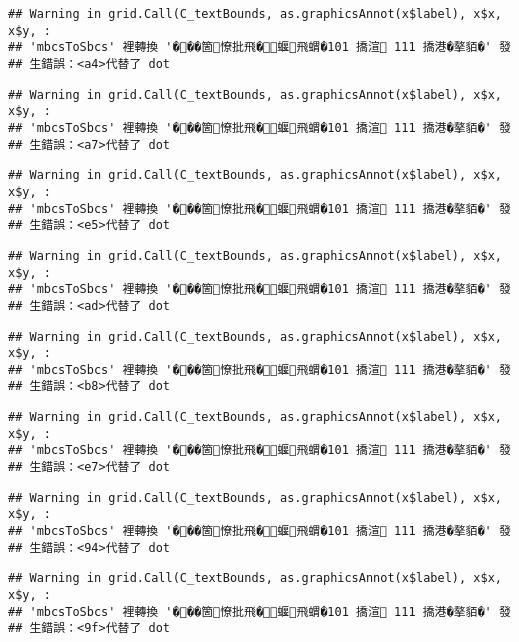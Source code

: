 \documentclass[
]{article}
\begin{document}
\begin{verbatim}
## Warning in grid.Call(C_textBounds, as.graphicsAnnot(x$label), x$x, x$y, :
## 'mbcsToSbcs' 裡轉換 '���箇憭批飛�蝘飛蝟�101 撟渲 111 撟港�摮貊�' 發
## 生錯誤：<a4>代替了 dot
\end{verbatim}

\begin{verbatim}
## Warning in grid.Call(C_textBounds, as.graphicsAnnot(x$label), x$x, x$y, :
## 'mbcsToSbcs' 裡轉換 '���箇憭批飛�蝘飛蝟�101 撟渲 111 撟港�摮貊�' 發
## 生錯誤：<a7>代替了 dot
\end{verbatim}

\begin{verbatim}
## Warning in grid.Call(C_textBounds, as.graphicsAnnot(x$label), x$x, x$y, :
## 'mbcsToSbcs' 裡轉換 '���箇憭批飛�蝘飛蝟�101 撟渲 111 撟港�摮貊�' 發
## 生錯誤：<e5>代替了 dot
\end{verbatim}

\begin{verbatim}
## Warning in grid.Call(C_textBounds, as.graphicsAnnot(x$label), x$x, x$y, :
## 'mbcsToSbcs' 裡轉換 '���箇憭批飛�蝘飛蝟�101 撟渲 111 撟港�摮貊�' 發
## 生錯誤：<ad>代替了 dot
\end{verbatim}

\begin{verbatim}
## Warning in grid.Call(C_textBounds, as.graphicsAnnot(x$label), x$x, x$y, :
## 'mbcsToSbcs' 裡轉換 '���箇憭批飛�蝘飛蝟�101 撟渲 111 撟港�摮貊�' 發
## 生錯誤：<b8>代替了 dot
\end{verbatim}

\begin{verbatim}
## Warning in grid.Call(C_textBounds, as.graphicsAnnot(x$label), x$x, x$y, :
## 'mbcsToSbcs' 裡轉換 '���箇憭批飛�蝘飛蝟�101 撟渲 111 撟港�摮貊�' 發
## 生錯誤：<e7>代替了 dot
\end{verbatim}

\begin{verbatim}
## Warning in grid.Call(C_textBounds, as.graphicsAnnot(x$label), x$x, x$y, :
## 'mbcsToSbcs' 裡轉換 '���箇憭批飛�蝘飛蝟�101 撟渲 111 撟港�摮貊�' 發
## 生錯誤：<94>代替了 dot
\end{verbatim}

\begin{verbatim}
## Warning in grid.Call(C_textBounds, as.graphicsAnnot(x$label), x$x, x$y, :
## 'mbcsToSbcs' 裡轉換 '���箇憭批飛�蝘飛蝟�101 撟渲 111 撟港�摮貊�' 發
## 生錯誤：<9f>代替了 dot
\end{verbatim}
\end{document}

